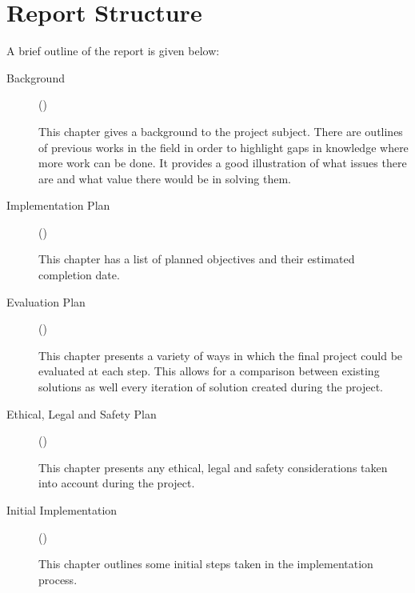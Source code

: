 \section{Report Structure}

A brief outline of the report is given below:

\begin{description}
      \item[Background] ()

            This chapter gives a background to the project subject. There are outlines of previous works in the field in order to highlight gaps in knowledge where more work can be done. It provides a good illustration of what issues there are and what value there would be in solving them.
      \item[Implementation Plan] ()

            This chapter has a list of planned objectives and their estimated completion date.
      \item[Evaluation Plan] ()

            This chapter presents a variety of ways in which the final project could be evaluated at each step. This allows for a comparison between existing solutions as well every iteration of solution created during the project.
      \item[Ethical, Legal and Safety Plan] ()

            This chapter presents any ethical, legal and safety considerations taken into account during the project.

      \item[Initial Implementation] ()

            This chapter outlines some initial steps taken in the implementation process.
\end{description}